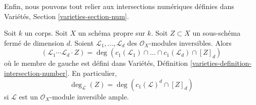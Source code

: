 \noindent
Enfin, nous pouvons tout relier aux intersections numériques
définies dans Variétés, Section \ref{varieties-section-num}.

\begin{lemma}
\label{lemma-degrees-and-numerical-intersections}
Soit $k$ un corps. Soit $X$ un schéma propre sur $k$.
Soit $Z \subset X$ un sous-schéma fermé de dimension $d$.
Soient $\mathcal{L}_1, \ldots, \mathcal{L}_d$ des
$\mathcal{O}_X$-modules inversibles. Alors
$$
(\mathcal{L}_1 \cdots \mathcal{L}_d \cdot Z) =
\deg(
c_1(\mathcal{L}_1) \cap \ldots \cap c_1(\mathcal{L}_d) \cap [Z]_d)
$$
où le membre de gauche est défini dans
Variétés, Définition \ref{varieties-definition-intersection-number}.
En particulier,
$$
\deg_\mathcal{L}(Z) = \deg(c_1(\mathcal{L})^d \cap [Z]_d)
$$
si $\mathcal{L}$ est un $\mathcal{O}_X$-module inversible ample.
\end{lemma}

